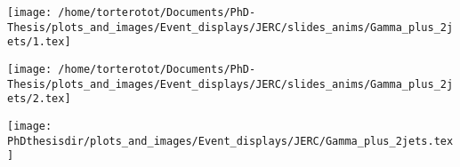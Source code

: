 \begin{frame}
\begin{center}
\texttt{[image: /home/torterotot/Documents/PhD-Thesis/plots\_and\_images/Event\_displays/JERC/slides\_anims/Gamma\_plus\_2jets/1.tex]}
\end{center}
\end{frame}

\begin{frame}
\addtocounter{framenumber}{-1}
\transboxout
{}
\begin{center}
\texttt{[image: /home/torterotot/Documents/PhD-Thesis/plots\_and\_images/Event\_displays/JERC/slides\_anims/Gamma\_plus\_2jets/2.tex]}
\end{center}
\end{frame}

\begin{frame}
\addtocounter{framenumber}{-1}
\transdissolve
\begin{center}
\texttt{[image: \\PhDthesisdir/plots\_and\_images/Event\_displays/JERC/Gamma\_plus\_2jets.tex]}
\end{center}
\end{frame}
